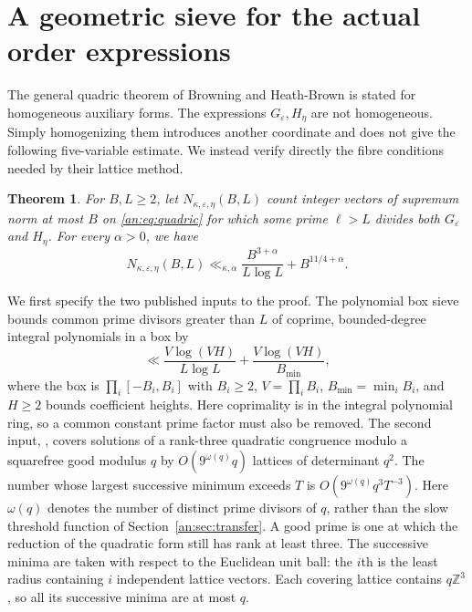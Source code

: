 \documentclass[11pt,reqno]{amsart}
\newtheorem{theorem}{Theorem}[section]
\theoremstyle{definition}
\numberwithin{equation}{section}
\newcommand{\eps}{\varepsilon}
\newcommand{\Z}{\mathbb Z}
\begin{document}
\appendix
\section{A geometric sieve for the actual order expressions}\label{an:app:large}
The general quadric theorem of Browning and Heath-Brown \cite[Theorem 1.2]{BHB} is stated for homogeneous auxiliary forms. The expressions $G_\eps,H_\eta$ are not homogeneous. Simply homogenizing them introduces another coordinate and does not give the following five-variable estimate. We instead verify directly the fibre conditions needed by their lattice method.

\begin{theorem}\label{an:thm:tail}
For $B,L\ge2$, let $N_{\kappa,\eps,\eta}(B,L)$ count integer vectors of supremum norm at most $B$ on \eqref{an:eq:quadric} for which some prime $\ell>L$ divides both $G_\eps$ and $H_\eta$. For every $\alpha>0$, we have
\begin{equation}\label{an:eq:tail}
 N_{\kappa,\eps,\eta}(B,L)
 \ll_{\kappa,\alpha}
 \frac{B^{3+\alpha}}{L\log L}+B^{11/4+\alpha}.
\end{equation}
\end{theorem}

We first specify the two published inputs to the proof. The polynomial box sieve \cite[Lemma 2.1]{BHB} bounds common prime divisors greater than $L$ of coprime, bounded-degree integral polynomials in a box by
\begin{equation}\label{an:eq:box}
 \ll \frac{V\log(VH)}{L\log L}
       +\frac{V\log(VH)}{B_{\min}},
\end{equation}
where the box is $\prod_i[-B_i,B_i]$ with $B_i\ge2$, $V=\prod_i B_i$, $B_{\min}=\min_i B_i$, and $H\ge2$ bounds coefficient heights. Here coprimality is in the integral polynomial ring, so a common constant prime factor must also be removed. The second input, \cite[Lemma 4.1]{BHB}, covers solutions of a rank-three quadratic congruence modulo a squarefree good modulus $q$ by $O(9^{\omega(q)}q)$ lattices of determinant $q^2$. The number whose largest successive minimum exceeds $T$ is $O(9^{\omega(q)}q^3T^{-3})$. Here $\omega(q)$ denotes the number of distinct prime divisors of $q$, rather than the slow threshold function of Section~\ref{an:sec:transfer}. A good prime is one at which the reduction of the quadratic form still has rank at least three. The successive minima are taken with respect to the Euclidean unit ball: the $i$th is the least radius containing $i$ independent lattice vectors. Each covering lattice contains $q\Z^3$, so all its successive minima are at most $q$.
\end{document}
